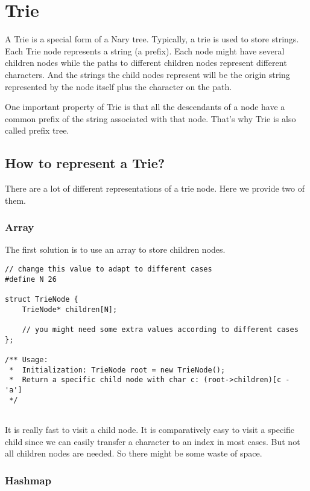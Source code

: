 
\chapter{Trie}

A Trie is a special form of a Nary tree. Typically, a trie is used to store strings. Each Trie node represents a string (a prefix). Each node might have several children nodes while the paths to different children nodes represent different characters. And the strings the child nodes represent will be the origin string represented by the node itself plus the character on the path.



One important property of Trie is that all the descendants of a node have a common prefix of the string associated with that node. That's why Trie is also called prefix tree.


\section{How to represent a Trie?}

There are a lot of different representations of a trie node. Here we provide two of them.

\subsection{Array}

The first solution is to use an array to store children nodes.

\begin{lstlisting}
// change this value to adapt to different cases
#define N 26

struct TrieNode {
    TrieNode* children[N];
    
    // you might need some extra values according to different cases
};

/** Usage:
 *  Initialization: TrieNode root = new TrieNode();
 *  Return a specific child node with char c: (root->children)[c - 'a']
 */
  
\end{lstlisting}

It is really fast to visit a child node. It is comparatively easy to visit a specific child since we can easily transfer a character to an index in most cases. But not all children nodes are needed. So there might be some waste of space.


\subsection{Hashmap}


